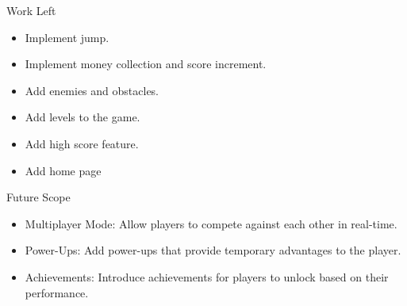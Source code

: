 \documentclass[pdf]{beamer}
\begin{document}
\begin{frame}{Work Left}
    \begin{itemize}
        \item Implement jump.
        \item Implement money collection and score increment.
        \item Add enemies and obstacles.
        \item Add levels to the game.
        \item Add high score feature.
        \item Add home page
    \end{itemize}  
\end{frame}

\begin{frame}{Future Scope}
    \begin{itemize}
        \item Multiplayer Mode: Allow players to compete against each other in real-time.
        \item Power-Ups: Add power-ups that provide temporary advantages to the player.
        \item Achievements: Introduce achievements for players to unlock based on 
        their performance.
    \end{itemize}
\end{frame}
\end{document}
